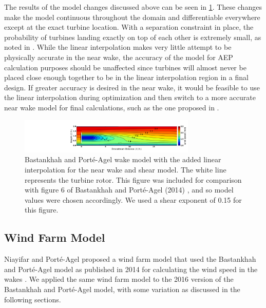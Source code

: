 \documentclass[conf]{new-aiaa}
\begin{document}
The results of the model changes discussed above can be seen in \cref{fig:model_contours}. These changes make the model continuous throughout the domain and differentiable everywhere except at the exact turbine location. With a separation constraint in place, the probability of turbines landing exactly on top of each other is extremely small, as noted in \cite{thomas2017}. While the linear interpolation makes very little attempt to be physically accurate in the near wake, the accuracy of the model for AEP calculation purposes should be unaffected since turbines will almost never be placed close enough together to be in the linear interpolation region in a final design. If greater accuracy is desired in the near wake, it would be feasible to use the linear interpolation during optimization and then switch to a more accurate near wake model for final calculations, such as the one proposed in \cite{keane2016}.

\begin{figure}[ht]
	\centering
	\includegraphics[width=0.75\textwidth, trim={18.5cm 1cm 4.cm 1cm}]{final_images/model_contours_vertical.pdf}
	\caption{Bastankhah and Port\'{e}-Agel wake model with the added linear interpolation for the near wake and shear model. The white line represents the turbine rotor. This figure was included for comparison with figure 6 of Bastankhah and Port\'{e}-Agel (2014) \cite{bastankhah2014}, and so model values were chosen accordingly. We used a shear exponent of 0.15 for this figure.}
	\label{fig:model_contours}
\end{figure}


\subsection{Wind Farm Model}
Niayifar and Port\'{e}-Agel proposed a wind farm model that used the Bastankhah and Port\'{e}-Agel model as published in 2014 \cite{bastankhah2014} for calculating the wind speed in the wakes \cite{niayifar2015, niayifar2016}. We applied the same wind farm model to the 2016 version of the Bastankhah and Port\'{e}-Agel model, with some variation as discussed in the following sections.
\end{document}
